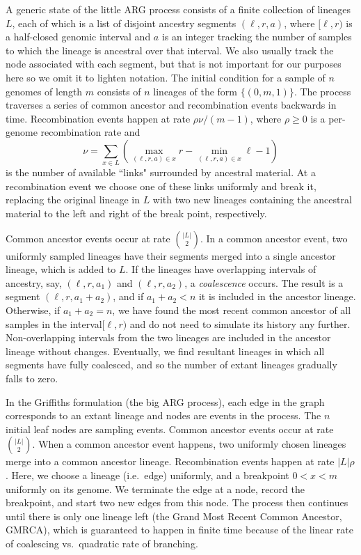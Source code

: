 \documentclass{article}
\begin{document}
A generic state of the little ARG process consists of a finite collection of lineages $L$,
each of which is a list of disjoint ancestry segments $(\ell, r, a)$, where
$[\ell, r)$ is a half-closed genomic interval and $a$ is an integer
tracking the number of samples to which the lineage is ancestral over that interval.
We also usually track the node associated with each segment, but
that is not important for our purposes here so we omit it to lighten notation.
The initial condition for a sample of $n$ genomes of length $m$ consists of $n$ lineages
of the form $\{(0, m, 1)\}$. The process traverses a series of common ancestor and
recombination events backwards in time.
Recombination events happen at rate $\rho \nu / (m - 1)$,
where $\rho \geq 0$ is a per-genome recombination rate and
 \[
 \nu = \sum_{x \in L}\left( \max_{(\ell, r, a) \in x}r
     - \min_{(\ell, r, a) \in x}\ell - 1 \right)
 \]
 is the number of available ``links" surrounded by ancestral material.
 At a recombination event we choose one of these links uniformly and break it,
 replacing the original lineage in $L$ with two new lineages containing the ancestral material
 to the left and right of the break point, respectively.

Common ancestor events occur at rate $\binom{|L|}{2}$.
In a common ancestor event, two uniformly sampled lineages have their segments
merged into a single ancestor lineage, which is added to $L$.
If the lineages have overlapping intervals of ancestry,
say, $(\ell, r, a_1)$ and $(\ell, r, a_2)$, a
\emph{coalescence} occurs. The result is a segment
$(\ell, r, a_1 + a_2)$, and if $a_1 + a_2 < n$ it is included in the
ancestor lineage. Otherwise, if $a_1 + a_2 = n$, we have found
the most recent common ancestor of all samples in the interval$[\ell, r)$
and do not need to simulate its history any further.
Non-overlapping intervals from the two lineages are included
 in the ancestor lineage without changes. Eventually,
we find resultant lineages in which all segments have fully coalesced,
and so the number of extant lineages gradually falls to zero.

In the Griffiths formulation (the big ARG process), each edge in the graph corresponds to an extant
lineage and nodes are events in the process. The $n$ initial leaf nodes are
sampling events. Common ancestor events occur at rate $\binom{|L|}{2}$.
When a common ancestor event happens, two uniformly chosen lineages
merge into a common ancestor lineage.
Recombination events happen at rate $|L| \rho$. Here, we choose a lineage (i.e.\ edge) uniformly,
and a breakpoint $0 < x < m$ uniformly on its genome. We terminate the edge at a
node, record the breakpoint, and start two new edges from this node. The process
then continues until there is only one lineage left (the Grand Most Recent
Common Ancestor, GMRCA), which is guaranteed to
happen in finite time because of the linear rate of coalescing vs.\ quadratic rate of branching.
\end{document}
